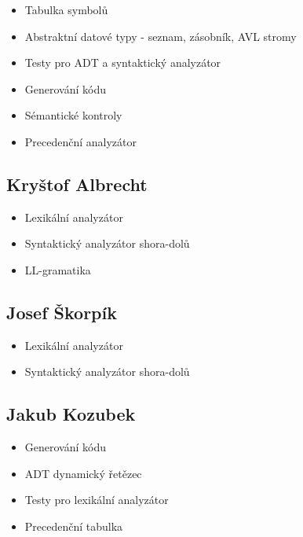 \documentclass[a4paper]{article}
\theoremstyle{definition}
\begin{document}
\begin{itemize}
	\item Tabulka symbolů

	\item Abstraktní datové typy - seznam, zásobník, AVL stromy

	\item Testy pro ADT a syntaktický analyzátor
	
	\item Generování kódu

	\item Sémantické kontroly
	
	\item Precedenční analyzátor
\end{itemize}

\subsection{Kryštof Albrecht}

\begin{itemize}
	\item Lexikální analyzátor

	\item Syntaktický analyzátor shora-dolů
	
	\item LL-gramatika
\end{itemize}

\subsection{Josef Škorpík}

\begin{itemize}
	\item Lexikální analyzátor
	
	\item Syntaktický analyzátor shora-dolů
\end{itemize}

\subsection{Jakub Kozubek}

\begin{itemize}
	\item Generování kódu
	
	\item ADT dynamický řetězec

	\item Testy pro lexikální analyzátor

	\item Precedenční tabulka
\end{itemize}
\end{document}
